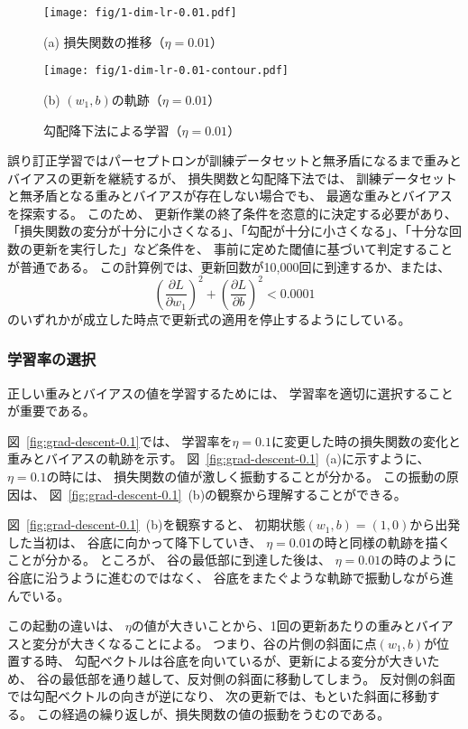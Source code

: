 \begin{figure}
  \centering

  \texttt{[image: fig/1-dim-lr-0.01.pdf]}

  (a) 損失関数の推移（$\eta = 0.01$）

  \texttt{[image: fig/1-dim-lr-0.01-contour.pdf]}

  (b) $(w_1, b)$の軌跡（$\eta = 0.01$）

  \caption{勾配降下法による学習（$\eta = 0.01$）}
  \label{fig:grad-descent-0.01}
\end{figure}

誤り訂正学習ではパーセプトロンが訓練データセットと無矛盾になるまで重みとバイアスの更新を継続するが、
損失関数と勾配降下法では、
訓練データセットと無矛盾となる重みとバイアスが存在しない場合でも、
最適な重みとバイアスを探索する。
このため、
更新作業の終了条件を恣意的に決定する必要があり、
「損失関数の変分が十分に小さくなる」、「勾配が十分に小さくなる」、「十分な回数の更新を実行した」など条件を、
事前に定めた閾値に基づいて判定することが普通である。
この計算例では、更新回数が10,000回に到達するか、または、
\[
  \left(\frac{\partial L}{\partial w_1}\right)^2 +
    \left(\frac{\partial L}{\partial b}\right)^2 < 0.0001
\]
のいずれかが成立した時点で更新式の適用を停止するようにしている。

\subsubsection{学習率の選択}
\label{sec:selection-learning-rate}

正しい重みとバイアスの値を学習するためには、
学習率を適切に選択することが重要である。

図~\ref{fig:grad-descent-0.1}では、
学習率を$\eta = 0.1$に変更した時の損失関数の変化と重みとバイアスの軌跡を示す。
図~\ref{fig:grad-descent-0.1}~(a)に示すように、
$\eta = 0.1$の時には、
損失関数の値が激しく振動することが分かる。
この振動の原因は、
図~\ref{fig:grad-descent-0.1}~(b)の観察から理解することができる。

図~\ref{fig:grad-descent-0.1}~(b)を観察すると、
初期状態$(w_1, b) = (1, 0)$から出発した当初は、
谷底に向かって降下していき、
$\eta = 0.01$の時と同様の軌跡を描くことが分かる。
ところが、
谷の最低部に到達した後は、
$\eta = 0.01$の時のように谷底に沿うように進むのではなく、
谷底をまたぐような軌跡で振動しながら進んでいる。

この起動の違いは、
$\eta$の値が大きいことから、1回の更新あたりの重みとバイアスと変分が大きくなることによる。
つまり、谷の片側の斜面に点$(w_1, b)$が位置する時、
勾配ベクトルは谷底を向いているが、更新による変分が大きいため、
谷の最低部を通り越して、反対側の斜面に移動してしまう。
反対側の斜面では勾配ベクトルの向きが逆になり、
次の更新では、もといた斜面に移動する。
この経過の繰り返しが、損失関数の値の振動をうむのである。

